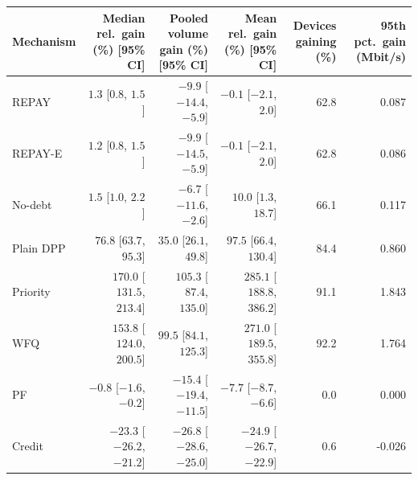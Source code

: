 \begin{tabular}{lrrrrr}
\toprule
Mechanism & Median rel.\ gain (\%) [95\% CI] & Pooled volume gain (\%) [95\% CI] & Mean rel.\ gain (\%) [95\% CI] & Devices gaining (\%) & 95th pct.\ gain (Mbit/s) \\
\midrule
REPAY & $1.3$ [$0.8$, $1.5$] & $-9.9$ [$-14.4$, $-5.9$] & $-0.1$ [$-2.1$, $2.0$] & 62.8 & 0.087 \\
REPAY-E & $1.2$ [$0.8$, $1.5$] & $-9.9$ [$-14.5$, $-5.9$] & $-0.1$ [$-2.1$, $2.0$] & 62.8 & 0.086 \\
No-debt & $1.5$ [$1.0$, $2.2$] & $-6.7$ [$-11.6$, $-2.6$] & $10.0$ [$1.3$, $18.7$] & 66.1 & 0.117 \\
Plain DPP & $76.8$ [$63.7$, $95.3$] & $35.0$ [$26.1$, $49.8$] & $97.5$ [$66.4$, $130.4$] & 84.4 & 0.860 \\
Priority & $170.0$ [$131.5$, $213.4$] & $105.3$ [$87.4$, $135.0$] & $285.1$ [$188.8$, $386.2$] & 91.1 & 1.843 \\
WFQ & $153.8$ [$124.0$, $200.5$] & $99.5$ [$84.1$, $125.3$] & $271.0$ [$189.5$, $355.8$] & 92.2 & 1.764 \\
PF & $-0.8$ [$-1.6$, $-0.2$] & $-15.4$ [$-19.4$, $-11.5$] & $-7.7$ [$-8.7$, $-6.6$] & 0.0 & 0.000 \\
Credit & $-23.3$ [$-26.2$, $-21.2$] & $-26.8$ [$-28.6$, $-25.0$] & $-24.9$ [$-26.7$, $-22.9$] & 0.6 & -0.026 \\
\bottomrule
\end{tabular}
